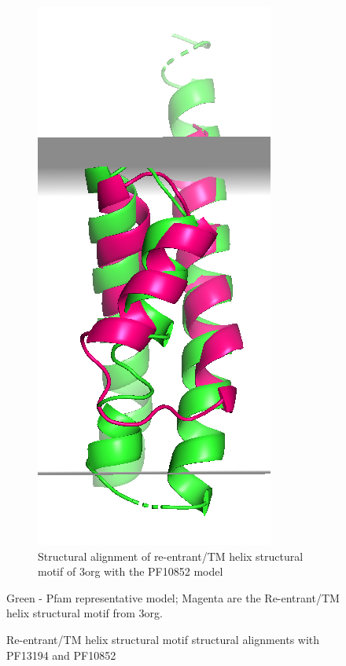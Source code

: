 \begin{figure}[htb]
\begin{subfigure}{0.3\textwidth}
  \includegraphics[width=\linewidth]{Pfam/10852.png}
  \caption{Structural alignment of re-entrant/TM helix structural motif of 3org with the PF10852 model}
  \label{fig:10852}
\end{subfigure}
\caption{Re-entrant/TM helix structural motif structural alignments with PF13194 and PF10852}
\small
\begin{flushleft}
Green - Pfam representative model; Magenta are the Re-entrant/TM helix structural motif from 3org. \end{flushleft}

\label{fig:mg_trans}
\end{figure}

